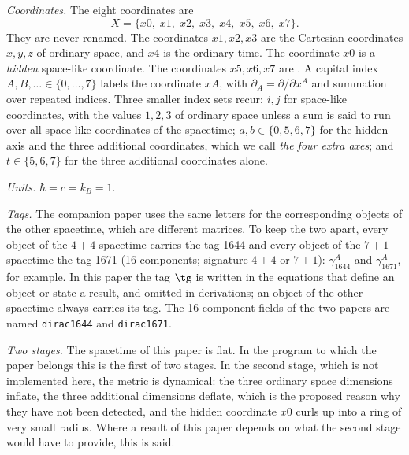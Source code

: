 \emph{Coordinates.} The eight coordinates are
\begin{equation}
X=\{x0,\;x1,\;x2,\;x3,\;x4,\;x5,\;x6,\;x7\}.
\label{eq:coords}
\end{equation}
They are never renamed. The coordinates $x1,x2,x3$ are the Cartesian coordinates $x,y,z$ of ordinary
space, and $x4$ is the ordinary time. The coordinate $x0$ is a \emph{hidden} space-like coordinate.
The coordinates $x5,x6,x7$ are . A capital index $A,B,\dots\in\{0,\dots,7\}$ labels the coordinate $xA$, with
$\partial_A=\partial/\partial x^A$ and summation over repeated indices. Three smaller index sets recur:
$i,j$ for space-like coordinates, with the values $1,2,3$ of ordinary space unless a sum is said to
run over all space-like coordinates of the spacetime; $a,b\in\{0,5,6,7\}$ for the hidden axis and
the three additional coordinates, which we call \emph{the four extra axes}; and $t\in\{5,6,7\}$ for
the three additional coordinates alone.

\emph{Units.} $\hbar=c=k_B=1$.

\emph{Tags.} The companion paper uses the same letters for the corresponding objects of the other
spacetime, which are different matrices. To keep the two apart, every object of the $4+4$ spacetime
carries the tag 1644 and every object of the $7+1$ spacetime the tag 1671 (16 components; signature
$4+4$ or $7+1$): $\gamma_{1644}^A$ and $\gamma_{1671}^A$, for example. In this paper the tag
$\tg$ is written in the equations that define an object or state a result, and omitted in derivations;
an object of the other spacetime always carries its tag. The 16-component fields of the two papers are
named \texttt{dirac1644} and \texttt{dirac1671}.

\emph{Two stages.} The spacetime of this paper is flat. In the program to which the paper belongs
this is the first of two stages. In the second stage, which is not implemented here, the metric is
dynamical: the three ordinary space dimensions inflate, the three additional dimensions deflate, which
is the proposed reason why they have not been detected, and the hidden coordinate $x0$ curls up into a
ring of very small radius. Where a result of this paper depends on what the second stage would have
to provide, this is said.
